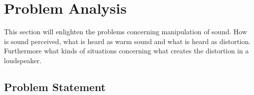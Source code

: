 \chapter{Problem Analysis}

This section will enlighten the problems concerning manipulation of sound. How is sound perceived, what is heard as warm sound and what is heard as distortion. Furthermore what kinds of situations concerning what creates the distortion in a loudspeaker. 






\section{Problem Statement}